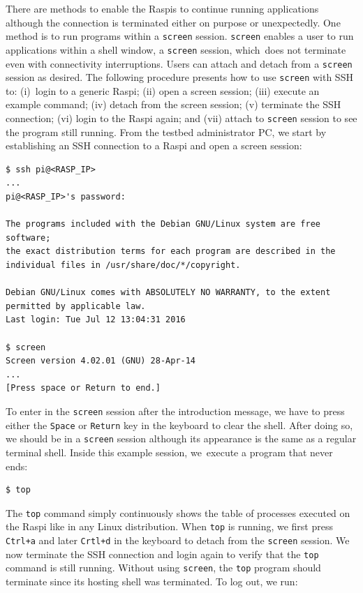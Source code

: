 \documentclass[electronics,article,accept,moreauthors,pdftex,10pt,a4paper]{mdpi}
\theoremstyle{mdpi}
\newcounter{ex}
\newcounter{re}
\theoremstyle{mdpidefinition}
\begin{document}
There are methods to enable the Raspis to continue running
applications although the connection is terminated either on purpose or
unexpectedly. One method is to run programs within a \texttt{screen} session.
\texttt{screen} enables a user to run applications within a shell
window, a \texttt{screen} session, which~does not terminate even with
connectivity interruptions. Users can attach and detach from a
\texttt{screen} session
as desired. The following procedure presents how to use \texttt{screen} with
SSH to: (i)~login to a generic Raspi; (ii) open a screen session;
(iii) execute an example command; (iv) detach from the screen session; (v)
terminate the SSH connection; (vi) login to the Raspi again;
and (vii) attach to \texttt{screen} session to see the program still running.
From the testbed administrator PC, we start by establishing an SSH
connection to a Raspi and open a screen session:

\begin{lstlisting}[]
$ ssh pi@<RASP_IP>
...
pi@<RASP_IP>'s password:

The programs included with the Debian GNU/Linux system are free software;
the exact distribution terms for each program are described in the
individual files in /usr/share/doc/*/copyright.

Debian GNU/Linux comes with ABSOLUTELY NO WARRANTY, to the extent
permitted by applicable law.
Last login: Tue Jul 12 13:04:31 2016

$ screen
Screen version 4.02.01 (GNU) 28-Apr-14
...
[Press space or Return to end.]
\end{lstlisting}
\FloatBarrier
\vspace{-5mm}

To enter in the \texttt{screen} session after the introduction message, we
have to press either the \texttt{Space} or \texttt{Return} key in the
keyboard to clear the shell. After doing so, we should be in a
\texttt{screen} session although its appearance is the same as a regular
terminal shell. Inside this example session, we~execute a program that
never ends:

\begin{lstlisting}[]
$ top
\end{lstlisting}
\FloatBarrier
\vspace{-5mm}

The \texttt{top} command simply continuously shows the table of processes
executed on the Raspi like in any Linux distribution. When \texttt{top}
is running, we first press \texttt{Ctrl+a} and later \texttt{Crtl+d}
in the keyboard to detach from the \texttt{screen} session. We now
terminate the SSH connection and login again to verify that the
\texttt{top} command is still running. Without using \texttt{screen},
the \texttt{top} program should terminate since its hosting shell was
terminated. To log out, we run:
\end{document}
